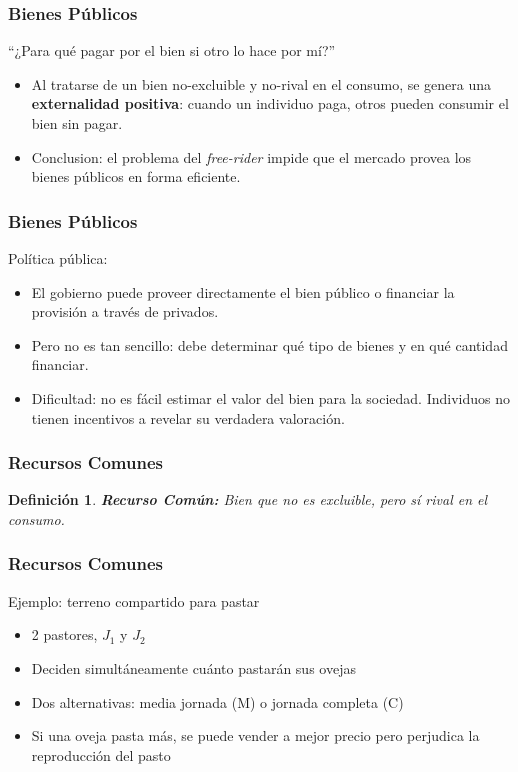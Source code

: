 \documentclass[dvipsnames,table,leqno]{beamer}
\newtheorem{mydef}{Definición}
\newcommand{\peq}[1]{{\scriptscriptstyle{#1}}}
\begin{document}
		\begin{frame}
			\frametitle{Bienes Públicos}
			``¿Para qué pagar por el bien si otro lo hace por mí?''
			\begin{itemize}
				\item Al tratarse de un bien no-excluible y no-rival en el consumo, se genera una \textbf{externalidad positiva}: cuando un individuo paga, otros pueden consumir el bien sin pagar.
				\item Conclusion: el problema del \emph{free-rider} impide que el mercado provea los bienes públicos en forma eficiente.
			\end{itemize}
		\end{frame}

		\begin{frame}
			\frametitle{Bienes Públicos}
			Política pública:
			\begin{itemize}
				\item El gobierno puede proveer directamente el bien público o financiar la provisión a través de privados.
				\item Pero no es tan sencillo: debe determinar qué tipo de bienes y en qué cantidad financiar.
				\item Dificultad: no es fácil estimar el valor del bien para la sociedad. Individuos no tienen incentivos a revelar su verdadera valoración.
			\end{itemize}
		\end{frame}

		\begin{frame}
			\frametitle{Recursos Comunes}
			\begin{mydef}
				\textbf{Recurso Común:} Bien que no es excluible, pero sí rival en el consumo.
			\end{mydef}
		\end{frame}

		\begin{frame}
			\frametitle{Recursos Comunes}
			Ejemplo: terreno compartido para pastar
			\begin{itemize}
				\item 2 pastores, $J_\peq{1}$ y $J_\peq{2}$
				\item Deciden simultáneamente cuánto pastarán sus ovejas
				\item Dos alternativas: media jornada (M) o jornada completa (C)
				\item Si una oveja pasta más, se puede vender a mejor precio pero perjudica la reproducción del pasto
			\end{itemize}
		\end{frame}	
\end{document}
